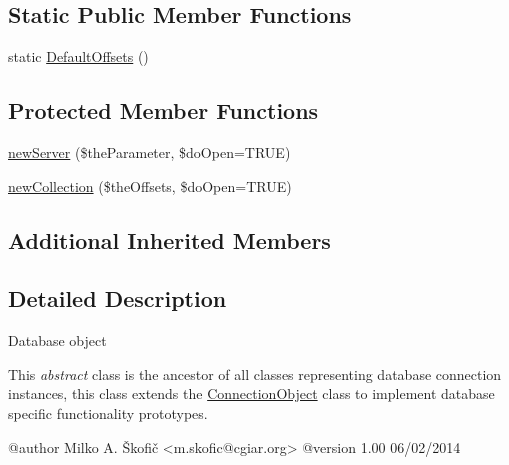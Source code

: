 \subsection*{Static Public Member Functions}
\begin{DoxyCompactItemize}
\item 
static \hyperlink{class_ontology_wrapper_1_1_database_object_acb6b501dfa770b9e1530f6c6d93190d4}{Default\-Offsets} ()
\end{DoxyCompactItemize}
\subsection*{Protected Member Functions}
\begin{DoxyCompactItemize}
\item 
\hyperlink{class_ontology_wrapper_1_1_database_object_a157076f382405b7af0dc901bfe830f0d}{new\-Server} (\$the\-Parameter, \$do\-Open=T\-R\-U\-E)
\item 
\hyperlink{class_ontology_wrapper_1_1_database_object_a471f77a15a606a616eb3511e15b4c4d4}{new\-Collection} (\$the\-Offsets, \$do\-Open=T\-R\-U\-E)
\end{DoxyCompactItemize}
\subsection*{Additional Inherited Members}


\subsection{Detailed Description}
Database object

This {\itshape abstract} class is the ancestor of all classes representing database connection instances, this class extends the \hyperlink{class_ontology_wrapper_1_1_connection_object}{Connection\-Object} class to implement database specific functionality prototypes. \begin{DoxyVerb} @author            Milko A. Škofič <m.skofic@cgiar.org>
 @version   1.00 06/02/2014\end{DoxyVerb}
 

